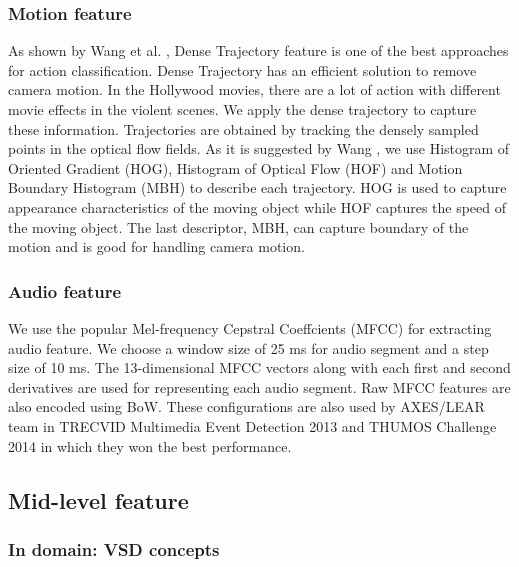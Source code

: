 \documentclass[twocolumn]{bmcart}%
\begin{document}
\subsubsection{Motion feature}
As shown by Wang et al. \cite{wang2013action}, Dense Trajectory feature is one of the best approaches for action classification. Dense Trajectory has an efficient solution to remove camera motion. In the Hollywood movies, there are a lot of action with different movie effects in the violent scenes. We apply the dense trajectory  to capture these information. Trajectories are obtained by tracking the densely sampled points in the optical flow fields. As it is suggested by Wang \cite{wang2013action}, we use Histogram of Oriented Gradient (HOG), Histogram of Optical Flow (HOF) and Motion Boundary Histogram (MBH) to describe each trajectory. HOG is used to capture appearance characteristics of the moving object while HOF captures the speed of the moving object. The last descriptor, MBH, can capture boundary of the motion and is good for handling camera motion.

\subsubsection{Audio feature}
We use the popular Mel-frequency Cepstral Coeffcients (MFCC) \cite{rabiner2007introduction} for extracting audio feature. We choose a window size of 25 ms for audio segment and a step size of 10 ms. The 13-dimensional MFCC vectors along with each first and second derivatives are used for representing each audio segment. Raw MFCC features are also encoded using BoW. These configurations are also used by AXES/LEAR team in TRECVID Multimedia Event Detection 2013 \cite{aly2013axes} and THUMOS Challenge 2014 \cite{oneata2014lear} in which they won the best performance.

\subsection{Mid-level feature}
\subsubsection{In domain: VSD concepts}
\end{document}
